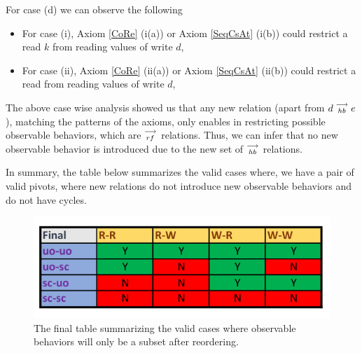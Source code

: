     For case (d) we can observe the following 
    \begin{itemize}
        \item For case (i), Axiom \ref{CoRe} (i(a)) or Axiom \ref{SeqCsAt} (i(b)) could restrict a read $k$ from reading values of write $d$, 
        \item For case (ii), Axiom \ref{CoRe} (ii(a)) or Axiom \ref{SeqCsAt} (ii(b)) could restrict a read from reading values of write $d$, 
    \end{itemize}
  
    The above case wise analysis showed us that any new relation (apart from $d\stackrel{\longrightarrow}{_{hb}}e$), matching the patterns of the axioms, only enables in restricting possible observable behaviors, which are $\stackrel{\longrightarrow}{_{rf}}$ relations. Thus, we can infer that no new observable behavior is introduced due to the new set of $\stackrel{\longrightarrow}{_{hb}}$ relations. 
    
    In summary, the table below summarizes the valid cases where, we have a pair of valid pivots, where new relations do not introduce new observable behaviors and do not have cycles. 

    \begin{figure}[H]
        \centering
        \includegraphics[scale=0.7]{5.InstructionReordering/4.ValidReorderingCandidate/part4_table.pdf}
        \caption{The final table summarizing the valid cases where observable behaviors will only be a subset after reordering.}
        \label{fig:my_label}
    \end{figure}

    